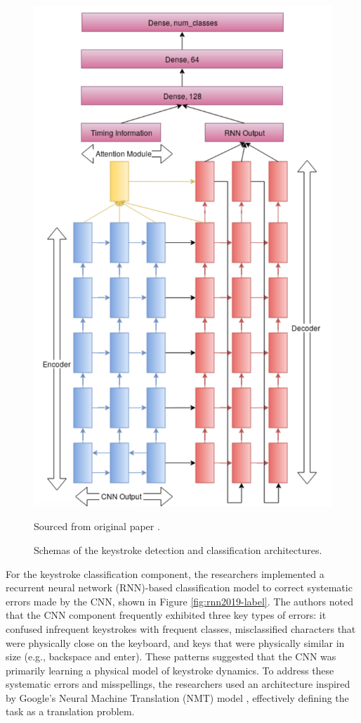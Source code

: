 \documentclass[a4paper,11pt,twoside]{report}
\theoremstyle{definition}
\begin{document}
\begin{figure}[h!]
\begin{minipage}{0.41\linewidth}
      \includegraphics[width=\linewidth]{img_related_work/rnn2019.png}
      \label{fig:rnn2019-label}
  \end{minipage}
  \caption{Schemas of the keystroke detection and classification architectures.}
  \footnotesize{Sourced from original paper \cite{cnn2019noise}.}
  \label{fig:enter-label}
\end{figure}

For the keystroke classification component, the researchers implemented a recurrent neural network (RNN)-based classification model to correct systematic errors made by the CNN, shown in Figure \ref{fig:rnn2019-label}. The authors noted that the CNN component frequently exhibited three key types of errors: it confused infrequent keystrokes with frequent classes, misclassified characters that were physically close on the keyboard, and keys that were physically similar in size (e.g., backspace and enter). These patterns suggested that the CNN was primarily learning a physical model of keystroke dynamics. To address these systematic errors and misspellings, the researchers used an architecture inspired by Google's Neural Machine Translation (NMT) model \cite{nmt}, effectively defining the task as a translation problem.
\end{document}
